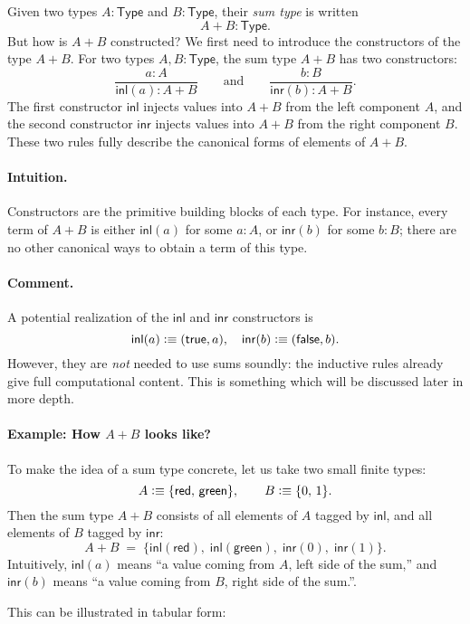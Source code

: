 \documentclass{article}
\newcommand{\Type}{\mathsf{Type}}
\newcommand{\defeq}{\vcentcolon\equiv}
\newcommand{\inl}{\mathsf{inl}}
\newcommand{\inr}{\mathsf{inr}}
\begin{document}
Given two types \(A : \Type\) and \(B : \Type\), their \emph{sum type}
is written
\[
A + B : \Type.
\]
But how is $A + B$ constructed? We first need to introduce the constructors of the type $A+B$. For two types \(A, B : \Type\), the sum type \(A + B\) has two constructors:
\[
\frac{a : A}{\inl(a) : A + B}
\qquad\text{and}\qquad
\frac{b : B}{\inr(b) : A + B}.
\]
The first constructor \(\inl\) injects values into $A+B$ from the left component \(A\), and the second constructor \(\inr\) injects values into $A+B$ from the right component \(B\). These two rules fully describe the canonical forms of elements of \(A + B\).

\paragraph{Intuition.}
Constructors are the primitive building blocks of each type.  
For instance, every term of \(A + B\) is either \(\inl(a)\) for some \(a : A\), or \(\inr(b)\) for some \(b : B\); there are no other canonical ways to obtain a term of this type.

\paragraph{Comment.} A potential realization of the $\inl$ and $\inr$ constructors is
\[
\inl(a)\defeq (\mathsf{true},a),\quad
\inr(b)\defeq (\mathsf{false},b).
\]
However, they are \emph{not} needed to use sums soundly: the inductive rules already give full computational content. This is something which will be discussed later in more depth.

\paragraph{Example: How \(A + B\) looks like?}

To make the idea of a sum type concrete, let us take two small finite types:
\[
A \defeq \{\mathsf{red},\, \mathsf{green}\}, 
\qquad
B \defeq \{0,\,1\}.
\]
Then the sum type \(A + B\) consists of all elements of \(A\) tagged by \(\inl\),
and all elements of \(B\) tagged by \(\inr\):
\[
A + B \;=\;
\{\inl(\mathsf{red}),\; \inl(\mathsf{green}),\;
  \inr(0),\; \inr(1)\}.
\]
Intuitively, \(\inl(a)\) means “a value coming from \(A\), left side of the sum,” and
\(\inr(b)\) means “a value coming from \(B\), right side of the sum.”. 

\bigskip
\noindent
This can be illustrated in tabular form:
\end{document}
